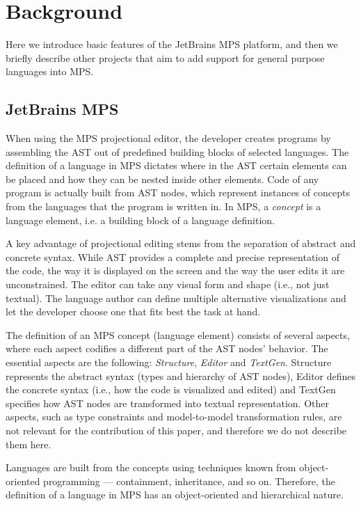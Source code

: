 \section{Background}
\label{sect:BACKGROUND}

Here we introduce basic features of the JetBrains MPS platform, and then we briefly describe other projects that aim to add support for general purpose languages into MPS.

\subsection{JetBrains MPS}
\label{sect:MPS}

When using the MPS projectional editor, the developer creates programs by assembling the AST out of predefined building blocks of selected languages.
The definition of a language in MPS dictates where in the AST certain elements can be placed and how they can be nested inside other elements.
Code of any program is actually built from AST nodes, which represent instances of concepts from the languages that the program is written in.
In MPS, a \emph{concept} is a language element, i.e. a building block of a language definition.

A key advantage of projectional editing stems from the separation of abstract and concrete syntax.
While AST provides a complete and precise representation of the code, the way it is displayed on the screen and the way the user edits it are unconstrained.
The editor can take any visual form and shape (i.e., not just textual).
The language author can define multiple alternative visualizations and let the developer choose one that fits best the task at hand.

The definition of an MPS concept (language element) consists of several aspects, where each aspect codifies a different part of the AST nodes' behavior.
The essential aspects are the following: \emph{Structure}, \emph{Editor} and \emph{TextGen}.
Structure represents the abstract syntax (types and hierarchy of AST nodes), Editor defines the concrete syntax (i.e., how the code is visualized and edited) and TextGen specifies how AST nodes are transformed into textual representation.
Other aspects, such as type constraints and model-to-model transformation rules, are not relevant for the contribution of this paper, and therefore we do not describe them here.

Languages are built from the concepts using techniques known from object-oriented programming --- containment, inheritance, and so on.
Therefore, the definition of a language in MPS has an object-oriented and hierarchical nature.

